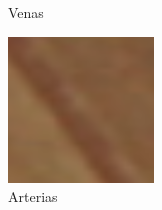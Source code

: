 \documentclass[xcolor=dvipsnames,table]{beamer}
\begin{document}
\begin{frame}
\begin{center}
{\begin{minipage}[t]{0.1\linewidth}
			\footnotesize Venas
		\end{minipage}\hspace{0.5cm}%
		\begin{minipage}[t]{0.1\linewidth}
			\centering
			\includegraphics[width=\linewidth]{my_images/contextualizacion/image3.png}\\[0.5ex]
			\footnotesize Arterias
		\end{minipage}\hspace{0.5cm}%
	}%
\end{center}
\end{frame}
\end{document}
